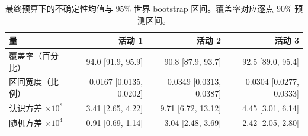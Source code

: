 \begin{table}[H]
\centering
\caption{最终预算下的不确定性均值与 95\% 世界 bootstrap 区间。覆盖率对应逐点 90\% 预测区间。}
\label{tab:uncertainty}
\scriptsize
\setlength{\tabcolsep}{3pt}
\begin{tabular}{lrrr}
\toprule
量 & 活动 1 & 活动 2 & 活动 3 \\
\midrule
覆盖率（百分比） & 94.0 [91.9, 95.9] & 90.8 [87.9, 93.7] & 92.5 [89.0, 95.4] \\
区间宽度（比例） & 0.0167 [0.0135, 0.0202] & 0.0349 [0.0313, 0.0387] & 0.0304 [0.0277, 0.0333] \\
认识方差 $\times10^8$ & 3.41 [2.65, 4.22] & 9.71 [6.72, 13.12] & 4.45 [3.01, 6.14] \\
随机方差 $\times10^4$ & 0.91 [0.69, 1.14] & 3.04 [2.48, 3.69] & 2.42 [2.05, 2.80] \\
\bottomrule
\end{tabular}
\end{table}
